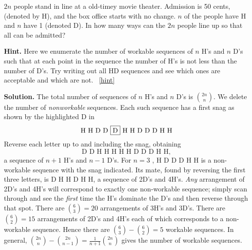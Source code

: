 \documentclass{book}
\begin{document}
\setcounter{project}{173}
\addtocounter{project}{-1}
\begin{activity}[]\label{act-hdseq}
\hypertarget{p-1020}{}%
\(2n\) people stand in line at a old-timey movie theater. Admission is 50 cents, (denoted by H), and the box office starts with no change. \(n\) of the people have H and \(n\) have \textdollar{}1 (denoted D). In how many ways can the \(2n\) people line up so that all can be admitted?%
\par\smallskip%
\noindent\textbf{Hint.}\hypertarget{hint-113}{}\quad%
\hypertarget{p-1021}{}%
Here we enumerate the number of workable sequences of \(n\) H's and \(n\) D's such that at each point in the sequence the number of H's is not less than the number of D's.  Try writing out all HD sequences and see which ones are acceptable and which are not.%
~\hfill{\tiny\hyperlink{a-173}{[hint]}\hypertarget{q-173}{}}\par\smallskip%
\noindent\textbf{Solution.}\hypertarget{solution-93}{}\quad%
\hypertarget{p-1022}{}%
The total number of sequences of \(n\) H's and \(n\) D's is \(\binom{2n}{n}\). We delete the number of \emph{nonworkable} sequences. Each such sequence has a first snag as shown by the highlighted D in%
\begin{equation*}
\text{H\ H\ D\ D\ \alert{D}\ H\ H\ D\ D\ D\ H\ H}
\end{equation*}
Reverse each letter up to and including the snag, obtaining%
\begin{equation*}
\text{D D H H H H H D D D H H},
\end{equation*}
a sequence of \(n+1\) H's and \(n-1\) D's. For \(n = 3\) , H D \alert{D} D H H is a non-workable sequence with the snag indicated. Its mate, found by reversing the first three letters, is D H H D H H, a sequence of 2D's and 4H's. \emph{Any} arrangement of 2D's and 4H's will correspond to exactly one non-workable sequence; simply scan through and see the \emph{first} time the H's dominate the D's and then reverse through that spot. There are \(\binom{6}{3}
= 20\) arrangements of 3H's and 3D's. There are \(\binom{6}{2}
= 15\) arrangements of 2D's and 4H's each of which corresponds to a non-workable sequence. Hence there are \(\binom{6}{3}
-\binom{6}{2} = 5\) workable sequences. In general, \(\binom{2n}{n}  - \binom{2n}{n - 1} = \frac{1}{n + 1}\binom{2n}{n}\) gives the number of workable sequences.%
\end{activity}
\end{document}
